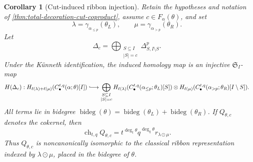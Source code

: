 \documentclass{amsart}
\newtheorem{corollary}[corollary]{Corollary}
\theoremstyle{definition}
\theoremstyle{remark}
\begin{document}
\begin{corollary}[Cut-induced ribbon injection]
\label{cor:ribbon-cut-exact-sequence}
Retain the hypotheses and notation of
\cref{thm:total-decoration-cut-coproduct}, assume $c\in F_\alpha(\theta)$,
and set
\[
 \lambda=\gamma_{\alpha_{\leq p}}(\theta_L),\qquad
 \mu=\gamma_{\alpha_{>p}}(\theta_R).
\]
Let
\[
 \Delta_c=\bigoplus_{\substack{S\subseteq I\\|S|=c}}
 \Delta^p_{S,I\setminus S}.
\]
Under the K\"unneth identification, the induced homology map is an injective
$\mathfrak S_I$-map
\begin{equation}
 H(\Delta_c):
 H_{\ell(\lambda)+\ell(\mu)}
   (C_\bullet^{t,q}(\alpha;\theta)[I])
 \lhook\joinrel\longrightarrow
 \bigoplus_{\substack{S\subseteq I\\|S|=c}}
 H_{\ell(\lambda)}
   (C_\bullet^{t,q}(\alpha_{\leq p};\theta_L)[S])
 \otimes
 H_{\ell(\mu)}
   (C_\bullet^{t,q}(\alpha_{>p};\theta_R)[I\setminus S]).
 \label{eq:ribbon-cut-homology-injection}
\end{equation}
All terms lie in bidegree
$\operatorname{bideg}(\theta)=
 \operatorname{bideg}(\theta_L)+\operatorname{bideg}(\theta_R)$.
If $Q_{\theta,c}$ denotes the cokernel, then
\begin{equation}
 \operatorname{ch}_{t,q}Q_{\theta,c}
 =t^{\deg_t\theta}q^{\deg_q\theta}r_{\lambda\odot\mu}.
 \label{eq:ribbon-cut-cokernel-character}
\end{equation}
Thus $Q_{\theta,c}$ is noncanonically isomorphic to the classical ribbon
representation indexed by $\lambda\odot\mu$, placed in the bidegree of
$\theta$.
\end{corollary}
\end{document}
